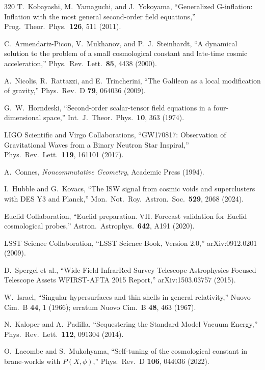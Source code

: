 \begin{thebibliography}{320}
T.~Kobayashi, M.~Yamaguchi, and J.~Yokoyama,
``Generalized G-inflation: Inflation with the most general second-order field equations,''
Prog.\ Theor.\ Phys.\ \textbf{126}, 511 (2011).

C.~Armendariz-Picon, V.~Mukhanov, and P.~J.~Steinhardt,
``A dynamical solution to the problem of a small cosmological constant and late-time cosmic acceleration,''
Phys.\ Rev.\ Lett.\ \textbf{85}, 4438 (2000).

A.~Nicolis, R.~Rattazzi, and E.~Trincherini,
``The Galileon as a local modification of gravity,''
Phys.\ Rev.\ D \textbf{79}, 064036 (2009).

G.~W.~Horndeski,
``Second-order scalar-tensor field equations in a four-dimensional space,''
Int.\ J.\ Theor.\ Phys.\ \textbf{10}, 363 (1974).

LIGO Scientific and Virgo Collaborations,
``GW170817: Observation of Gravitational Waves from a Binary Neutron Star Inspiral,''
Phys.\ Rev.\ Lett.\ \textbf{119}, 161101 (2017).

A.~Connes,
\emph{Noncommutative Geometry},
Academic Press (1994).

I.~Hubble and G.~Kovacs,
``The ISW signal from cosmic voids and superclusters with DES Y3 and Planck,''
Mon.\ Not.\ Roy.\ Astron.\ Soc.\ \textbf{529}, 2068 (2024).

Euclid Collaboration,
``Euclid preparation. VII. Forecast validation for Euclid cosmological probes,''
Astron.\ Astrophys.\ \textbf{642}, A191 (2020).

LSST Science Collaboration,
``LSST Science Book, Version 2.0,''
arXiv:0912.0201 (2009).

D.~Spergel et al.,
``Wide-Field InfrarRed Survey Telescope-Astrophysics Focused Telescope Assets WFIRST-AFTA 2015 Report,''
arXiv:1503.03757 (2015).

W.~Israel,
``Singular hypersurfaces and thin shells in general relativity,''
Nuovo Cim.\ B \textbf{44}, 1 (1966);
erratum Nuovo Cim.\ B \textbf{48}, 463 (1967).

N.~Kaloper and A.~Padilla,
``Sequestering the Standard Model Vacuum Energy,''
Phys.\ Rev.\ Lett.\ \textbf{112}, 091304 (2014).

O.~Lacombe and S.~Mukohyama,
``Self-tuning of the cosmological constant in brane-worlds with $P(X,\phi)$,''
Phys.\ Rev.\ D \textbf{106}, 044036 (2022).


\end{thebibliography}
